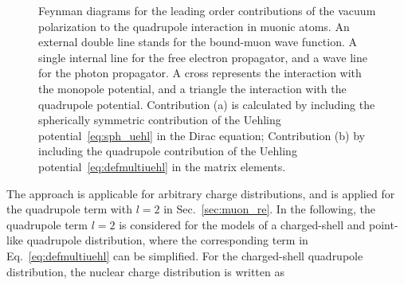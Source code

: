 %
\begin{figure}[t]%
\centering
{}
\hspace{2cm}
\caption{
Feynman diagrams for the leading order contributions of the vacuum polarization to the quadrupole interaction in muonic atoms. An external double line stands for the bound-muon wave function. A single internal line for the free electron propagator, and a wave line for the photon propagator. A cross represents the interaction with the monopole potential, and a triangle the interaction with the quadrupole potential. Contribution (a) is calculated by including the spherically symmetric contribution of the Uehling potential~\eqref{eq:sph_uehl} in the Dirac equation; Contribution (b) by including the quadrupole contribution of the Uehling potential~\eqref{eq:defmultiuehl} in the matrix elements.
}
\label{fig:quehl}
\end{figure}
%
The approach is applicable for arbitrary charge distributions, and is applied for the quadrupole term with $l=2$ in Sec.~\ref{sec:muon_re}. In the following, the quadrupole term $l=2$ is considered for the models of a charged-shell and point-like quadrupole distribution, where the corresponding term in Eq.~\eqref{eq:defmultiuehl} can be simplified. For the charged-shell quadrupole distribution, the nuclear charge distribution is written as
